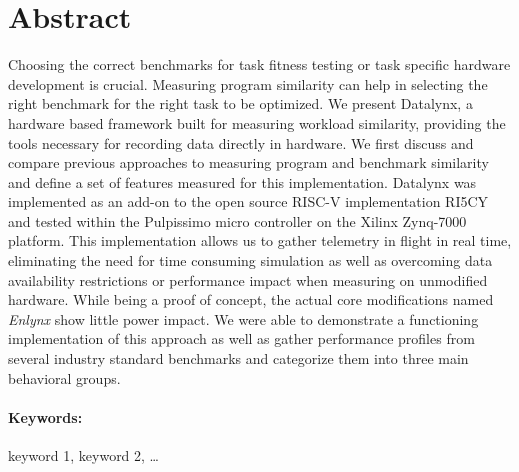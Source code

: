 \documentclass[bachelor_paper.tex]{subfiles}
\begin{document}
\section*{Abstract}\thispagestyle{empty}
    \label{chap:abstract}

    Choosing the correct benchmarks for task fitness testing or task specific hardware development is crucial. Measuring program similarity can help in selecting the right benchmark for the right task to be optimized. We present Datalynx, a hardware based framework built for measuring workload similarity, providing the tools necessary for recording data directly in hardware. We first discuss and compare previous approaches to measuring program and benchmark similarity and define a set of features measured for this implementation. Datalynx was implemented as an add-on to the open source RISC-V implementation RI5CY and tested within the Pulpissimo micro controller on the Xilinx Zynq-7000 platform. This implementation allows us to gather telemetry in flight in real time, eliminating the need for time consuming simulation as well as overcoming data availability restrictions or performance impact when measuring on unmodified hardware. While being a proof of concept, the actual core modifications named \emph{Enlynx} show little power impact. We were able to demonstrate a functioning implementation of this approach as well as gather performance profiles from several industry standard benchmarks and categorize them into three main behavioral groups.
    
    \vfill
\paragraph*{Keywords:} keyword 1, keyword 2, \dots

\isstandalone



\fi
\end{document}
